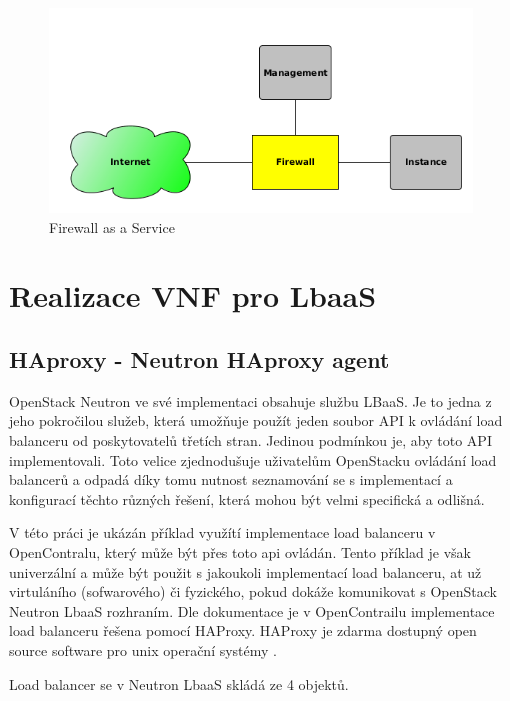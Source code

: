 \begin{figure}[h]
\begin{centering}
\includegraphics[scale=0.6]{images/firewall}
\par\end{centering}
\caption{Firewall as a Service\label{fig:firewall}}
\end{figure}

\section{Realizace VNF pro LbaaS}

\subsection{HAproxy - Neutron HAproxy agent}

OpenStack Neutron ve své implementaci obsahuje službu LBaaS. Je to jedna z jeho pokročilou služeb, která umožňuje použít jeden soubor API k ovládání load balanceru od poskytovatelů třetích stran. Jedinou podmínkou je, aby toto API implementovali. Toto velice zjednodušuje uživatelům OpenStacku ovládání load balancerů a odpadá díky tomu nutnost seznamování se s implementací a konfigurací těchto různých řešení, která mohou být velmi specifická a odlišná.

V této práci je ukázán příklad využítí implementace load balanceru v OpenContralu, který může být přes toto api ovládán. Tento příklad je však univerzální a může být použit s jakoukoli implementací load balanceru, at už virtuláního (sofwarového) či fyzického, pokud dokáže komunikovat s OpenStack Neutron LbaaS rozhraním. Dle dokumentace \cite{contrail_loadbalancer} je v OpenContrailu implementace load balanceru řešena pomocí HAProxy. HAProxy je zdarma dostupný open source software pro unix operační systémy \cite{HAProxy}. 

Load balancer se v Neutron LbaaS skládá ze 4 objektů.


